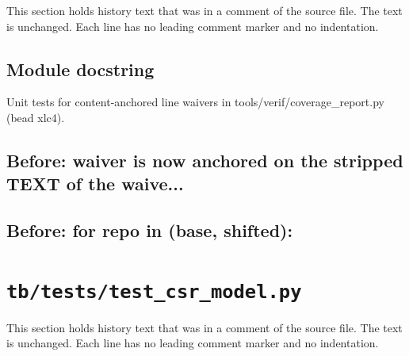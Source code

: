 This section holds history text that was in a comment of the source file. The text is unchanged. Each line has no leading comment marker and no indentation.

\begin{record}

\subsection*{Module docstring}

\begin{textblock}
Unit tests for content-anchored line waivers in tools/verif/coverage_report.py (bead xlc4).
\end{textblock}

\subsection*{Before: waiver is now anchored on the stripped TEXT of the waive...}


\subsection*{Before: for repo in (base, shifted):}


\end{record}

\section{\texttt{tb/tests/test\_csr\_model.py}}\label{cr:suite:test-csr-model}

This section holds history text that was in a comment of the source file. The text is unchanged. Each line has no leading comment marker and no indentation.

